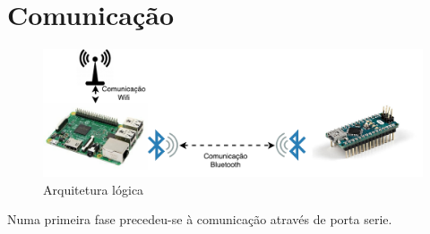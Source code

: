 \newpage
\section{Comunicação}



\begin{figure}[!htb]
	\centering
	\includegraphics[width=\linewidth]{img/comm-blue/HW-geral.pdf}
	\caption{Arquitetura lógica}
	\label{opencvlogo}
\end{figure}




Numa primeira fase precedeu-se à comunicação através de porta serie. 





